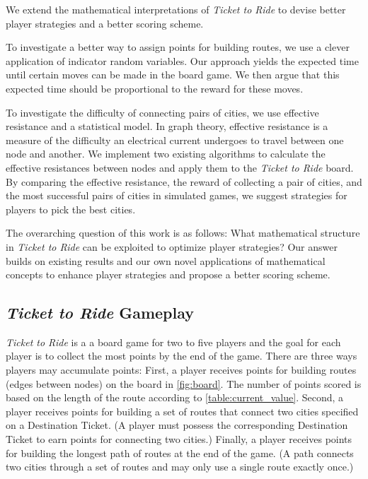 We extend the mathematical interpretations of
\textit{Ticket to Ride} to devise better player strategies
and a better scoring scheme.

To investigate a better way to assign points for building routes,
we use a clever application of indicator random variables.
Our approach yields the expected time until certain moves
can be made in the board game.
We then argue that this expected time should be proportional
to the reward for these moves.

To investigate the difficulty of connecting pairs of cities,
we use effective resistance and a statistical model.
In graph theory, effective resistance is a measure of the 
difficulty an electrical current undergoes to travel
between one node and another.
We implement two existing algorithms to calculate
the effective resistances between nodes
\cite{ellens2011effective, wu2004theory}
and apply them to the \textit{Ticket to Ride} board.
By comparing the effective resistance, the reward
of collecting a pair of cities, and the most successful
pairs of cities in simulated games, we suggest
strategies for players to pick the best cities.

The overarching question of this work is as follows:
What mathematical structure in \textit{Ticket to Ride}
can be exploited to optimize player strategies?
Our answer builds on existing results and
our own novel applications of mathematical concepts to enhance
player strategies and propose a better scoring scheme.

\subsection{\textit{Ticket to Ride} Gameplay}

\textit{Ticket to Ride} is a a board game for two to five
players and the goal for each player is to collect
the most points by the end of the game.
There are three ways players may accumulate points:
First, a player receives points for building routes
(edges between nodes)
on the board in \cref{fig:board}.
The number of points scored is based on the length of the route
according to \cref{table:current_value}.
Second, a player receives points for building
a set of routes that connect two cities specified
on a Destination Ticket.
(A player must possess the corresponding Destination Ticket to earn
points for connecting two cities.)
Finally, a player receives points for building
the longest path of routes at the end of the game.
(A path connects two cities through a set
of routes and may only use a single route exactly once.)


